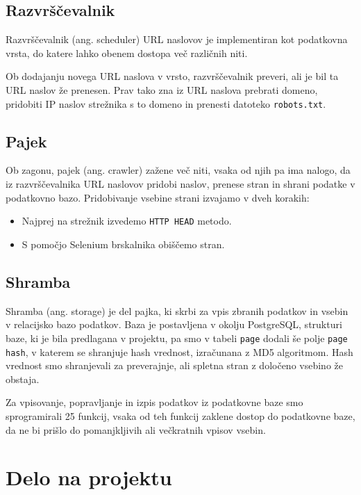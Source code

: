 \documentclass[conference]{IEEEtran}
\begin{document}
	\subsection{Razvrščevalnik}

	Razvrščevalnik (ang. scheduler) URL naslovov je implementiran kot podatkovna vrsta, do katere lahko obenem dostopa več različnih niti. 
	
	Ob dodajanju novega URL naslova v vrsto, razvrščevalnik preveri, ali je bil ta URL naslov že prenesen. Prav tako zna iz URL naslova prebrati domeno, pridobiti IP naslov strežnika s to domeno in prenesti datoteko \texttt{robots.txt}.
	
	\subsection{Pajek}
	
	Ob zagonu, pajek (ang. crawler) zažene več niti, vsaka od njih pa ima nalogo, da iz razvrščevalnika URL naslovov pridobi naslov, prenese stran in shrani podatke v podatkovno bazo. Pridobivanje vsebine strani izvajamo v dveh korakih:
	
	\begin{itemize}
		\item Najprej na strežnik izvedemo \texttt{HTTP HEAD} metodo.
		\item S pomočjo Selenium brskalnika obiščemo stran.
	\end{itemize}
	
	\subsection{Shramba}
	
	Shramba (ang. storage) je del pajka, ki skrbi za vpis zbranih podatkov in vsebin v relacijsko bazo podatkov. Baza je postavljena v okolju PostgreSQL, strukturi baze, ki je bila predlagana v projektu, pa smo v tabeli \texttt{page} dodali še polje \texttt{page hash}, v katerem se shranjuje hash vrednost, izračunana z MD5 algoritmom. Hash vrednost smo shranjevali za preverajnje, ali spletna stran z določeno vsebino že obstaja. 
	
	Za vpisovanje, popravljanje in izpis podatkov iz podatkovne baze smo sprogramirali 25 funkcij, vsaka od teh funkcij zaklene dostop do podatkovne baze, da ne bi prišlo do pomanjkljivih ali večkratnih vpisov vsebin.
	
	\section{Delo na projektu}
	
\end{document}
